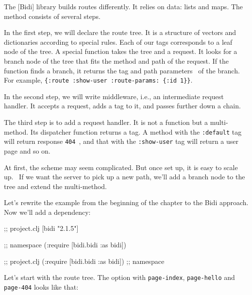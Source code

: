 
The [Bidi] library builds routes differently. It relies on data: lists and maps. The method consists of several steps.

In the first step, we will declare the route tree. It is a structure of vectors and dictionaries according to special rules. Each of our tags corresponds to a leaf node of the tree. A special function takes the tree and a request. It looks for a branch node of the tree that fits the method and path of the request. If the function finds a branch, it returns the tag and path parameters  of the branch. For example, \verb|{:route :show-user :route-params: {:id 1}}|.


In the second step, we will write middleware, i.e., an intermediate request handler. It accepts a request, adds a tag to it, and passes further down a chain.

The third step is to add a request handler. It is not a function but a multi-method.
Its dispatcher function returns a tag. A method with the \verb|:default| tag will return response \verb|404 |, and that with the \verb|:show-user| tag will return a user page and so on.

At first, the scheme may seem complicated. But once set up, it is easy to scale up.  If we want the server to pick up a new path, we'll add a branch node to the tree and extend the multi-method.


Let's rewrite the example from the beginning of the chapter to the Bidi approach. Now we'll add a dependency:

\ifx\DEVICETYPE\MOBILE

\begin{clojure}
;; project.clj
[bidi "2.1.5"]

;; namespace
(:require [bidi.bidi :as bidi])
\end{clojure}

\else

\begin{clojure}
[bidi "2.1.5"]                  ;; project.clj
(:require [bidi.bidi :as bidi]) ;; namespace
\end{clojure}

\fi

Let's start with the route tree. The option with \verb|page-index|, \verb|page-hello| and \verb|page-404| looks like that:

